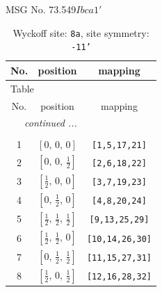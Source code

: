 \documentclass[fleqn,8pt]{jsarticle}
\begin{document}
\setcounter{MaxMatrixCols}{32}

\renewcommand{\tablename}{Table~}
\renewcommand{\figurename}{Figure~}
\begin{center}
\LARGE
MSG No. 73.549\quad$Ibca1'$
\end{center}
\renewcommand{\arraystretch}{1.2}
\begin{longtable}{ccc}
\caption{Wyckoff site: {\tt 8a}, site symmetry: {\tt -11'}}
 \\
 \hline \hline
No. & position & mapping \\ \hline \endfirsthead

\multicolumn{2}{l}{\tablename\ \thetable{}} \\
 \hline \hline
No. & position & mapping \\ \hline \endhead

 \hline \hline
\multicolumn{2}{r}{\footnotesize\it continued ...} \\ \endfoot

 \hline \hline
\multicolumn{2}{r}{} \\ \endlastfoot

1 & $\left[ 0,\, 0,\, 0 \right]$ & {\tt [1,5,17,21]} \\ \hline
2 & $\left[ 0,\, 0,\, \frac{1}{2} \right]$ & {\tt [2,6,18,22]} \\ \hline
3 & $\left[ \frac{1}{2},\, 0,\, 0 \right]$ & {\tt [3,7,19,23]} \\ \hline
4 & $\left[ 0,\, \frac{1}{2},\, 0 \right]$ & {\tt [4,8,20,24]} \\ \hline
5 & $\left[ \frac{1}{2},\, \frac{1}{2},\, \frac{1}{2} \right]$ & {\tt [9,13,25,29]} \\ \hline
6 & $\left[ \frac{1}{2},\, \frac{1}{2},\, 0 \right]$ & {\tt [10,14,26,30]} \\ \hline
7 & $\left[ 0,\, \frac{1}{2},\, \frac{1}{2} \right]$ & {\tt [11,15,27,31]} \\ \hline
8 & $\left[ \frac{1}{2},\, 0,\, \frac{1}{2} \right]$ & {\tt [12,16,28,32]} \\
\end{longtable}
\renewcommand{\arraystretch}{1.2}
\end{document}
